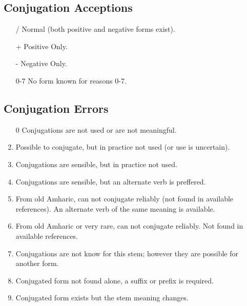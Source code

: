 


\subsection*{Conjugation Acceptions}

\begin{enumerate}
  \item[/]  Normal (both positive and negative forms exist).
  \item[+]  Positive Only.
  \item[-]  Negative Only.
  \item[0-7]  No form known for reasons 0-7.
\end{enumerate}


\vspace{0.5in}
\subsection*{Conjugation Errors}

\begin{enumerate}
  \item[0]  Conjugations are not used or are not meaningful.

  \item  Possible to conjugate, but in practice not used
         (or use is uncertain).

  \item  Conjugations are sensible, but in practice not used.

  \item  Conjugations are sensible, but an alternate verb is preffered.

  \item  From old Amharic, can not conjugate reliably (not found in available
         references).  An alternate verb of the same meaning is available.

  \item  From old Amharic or very rare, can not conjugate reliably.
         Not found in available references.

  \item  Conjugations are not know for this stem; however they are possible
         for another form.

  \item  Conjugated form not found alone, a suffix or prefix is required.

  \item  Conjugated form exists but the stem meaning changes.
\end{enumerate}


